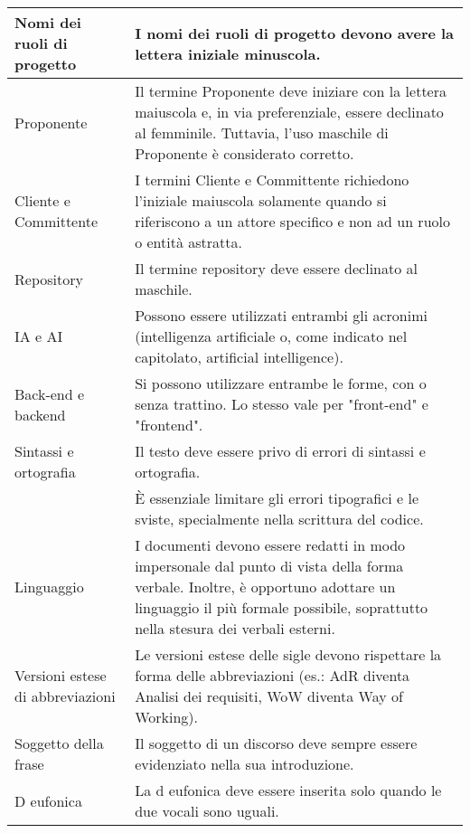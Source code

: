 \begin{adjustwidth}{-0.5cm}{-0.5cm}
\begin{longtable}{|P{4.5cm}|>{\raggedright\arraybackslash}P{9cm}|}
    Nomi dei ruoli di progetto & I nomi dei ruoli di progetto devono avere la lettera iniziale minuscola. \\
    \hline Proponente & Il termine Proponente deve iniziare con la lettera maiuscola e, in via preferenziale, essere declinato al femminile. Tuttavia, l'uso maschile di Proponente è considerato corretto.\\
    \hline Cliente e Committente & I termini Cliente e Committente richiedono l'iniziale maiuscola solamente quando si riferiscono a un attore specifico e non ad un ruolo o entità astratta.\\
		\hline Repository & Il termine repository deve essere declinato al maschile.\\
    \hline IA e AI & Possono essere utilizzati entrambi gli acronimi (intelligenza artificiale o, come indicato nel capitolato, artificial intelligence).\\
    \hline Back-end e backend & Si possono utilizzare entrambe le forme, con o senza trattino. Lo stesso vale per "front-end" e "frontend".\\
    \hline Sintassi e ortografia & Il testo deve essere privo di errori di sintassi e ortografia. \\
    \hline {} & È essenziale limitare gli errori tipografici e le sviste, specialmente nella scrittura del codice. \\
    \hline Linguaggio & I documenti devono essere redatti in modo impersonale dal punto di vista della forma verbale. Inoltre, è opportuno adottare un linguaggio il più formale possibile, soprattutto nella stesura dei verbali esterni. \\
    \hline Versioni estese di abbreviazioni & Le versioni estese delle sigle devono rispettare la forma delle abbreviazioni (es.: AdR diventa Analisi dei requisiti, WoW diventa Way of Working). \\
		\hline Soggetto della frase & Il soggetto di un discorso deve sempre essere evidenziato nella sua introduzione. \\
		\hline D eufonica & La d eufonica deve essere inserita solo quando le due vocali sono uguali. \\
  \end{longtable}
\end{adjustwidth}
\egroup